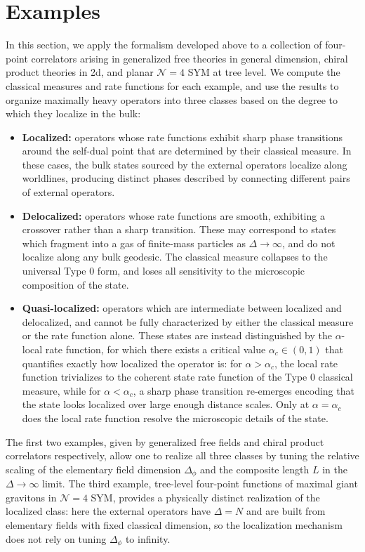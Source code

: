 \documentclass[a4paper,11pt]{article}
\theoremstyle{plain}
\theoremstyle{definition}
\theoremstyle{remark}
\newcommand{\Df}{\Delta_\phi}
\newcommand{\De}{\Delta}
\begin{document}
\section{Examples}
\label{sec:examples}

In this section, we apply the formalism developed above to a collection of four-point correlators arising in generalized free theories in general dimension, chiral product theories in 2d, and planar $\mathcal{N} = 4$ SYM at tree level. We compute the classical measures and rate functions for each example, and use the results to organize maximally heavy operators into three classes based on the degree to which they localize in the bulk:
\begin{itemize}[leftmargin=*]
\item \textbf{Localized:} operators whose rate functions exhibit sharp phase transitions around the self-dual point that are determined by their classical measure. In these cases, the bulk states sourced by the external operators localize along worldlines, producing distinct phases described by connecting different pairs of external operators.
\item \textbf{Delocalized:} operators whose rate functions are smooth, exhibiting a crossover rather than a sharp transition. These may correspond to states which fragment into a gas of finite-mass particles as $\De \to \infty$, and do not localize along any bulk geodesic. The classical measure collapses to the universal Type 0 form, and loses all sensitivity to the microscopic composition of the state.
\item \textbf{Quasi-localized:} operators which are intermediate between localized and delocalized, and cannot be fully characterized by either the classical measure or the rate function alone. These states are instead distinguished by the $\alpha$-local rate function, for which there exists a critical value $\alpha_c \in (0,1)$ that quantifies exactly how localized the operator is: for $\alpha > \alpha_c$, the local rate function trivializes to the coherent state rate function of the Type 0 classical measure, while for $\alpha < \alpha_c$, a sharp phase transition re-emerges encoding that the state looks localized over large enough distance scales. Only at $\alpha = \alpha_c$ does the local rate function resolve the microscopic details of the state.
\end{itemize}
The first two examples, given by generalized free fields and chiral product correlators respectively, allow one to realize all three classes by tuning the relative scaling of the elementary field dimension $\Df$ and the composite length $L$ in the $\De \to \infty$ limit. The third example, tree-level four-point functions of maximal giant gravitons in $\mathcal{N} = 4$ SYM, provides a physically distinct realization of the localized class: here the external operators have $\De = N$ and are built from elementary fields with fixed classical dimension, so the localization mechanism does not rely on tuning $\Df$ to infinity.
\end{document}
